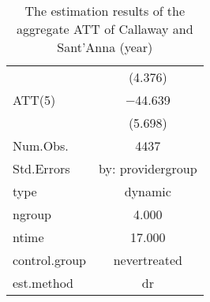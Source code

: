 \begin{table}
\begin{tabular}[t]{lc}
 & (\num{4.376})\\
ATT(5) & \num{-44.639}\\
 & (\num{5.698})\\
\midrule
Num.Obs. & \num{4437}\\
Std.Errors & by: providergroup\\
type & dynamic\\
ngroup & \num{4.000}\\
ntime & \num{17.000}\\
control.group & nevertreated\\
est.method & dr\\
\bottomrule
\end{tabular}
\caption{The estimation results of the aggregate ATT of Callaway and Sant'Anna (year)}
\end{table}
